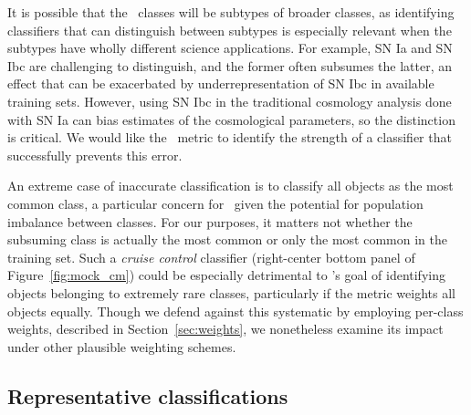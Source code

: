 It is possible that the \plasticc\ classes will be subtypes of broader classes, as identifying classifiers that can distinguish between subtypes is especially relevant when the subtypes have wholly different science applications.
For example, SN Ia and SN Ibc are challenging to distinguish, and the former often subsumes the latter, an effect that can be exacerbated by underrepresentation of SN Ibc in available training sets.
However, using SN Ibc in the traditional cosmology analysis done with SN Ia can bias estimates of the cosmological parameters, so the distinction is critical.
We would like the \plasticc\ metric to identify the strength of a classifier that successfully prevents this error.

An extreme case of inaccurate classification is to classify all objects as the most common class, a particular concern for \plasticc\ given the potential for population imbalance between classes.
For our purposes, it matters not whether the subsuming class is actually the most common or only the most common in the training set.
Such a \textit{cruise control} classifier (right-center bottom panel of Figure~\ref{fig:mock_cm}) could be especially detrimental to \plasticc's goal of identifying objects belonging to extremely rare classes, particularly if the metric weights all objects equally.
Though we defend against this systematic by employing per-class weights, described in Section~\ref{sec:weights}, we nonetheless examine its impact under other plausible weighting schemes.

%

\subsection{Representative classifications}
\label{sec:realdata}

